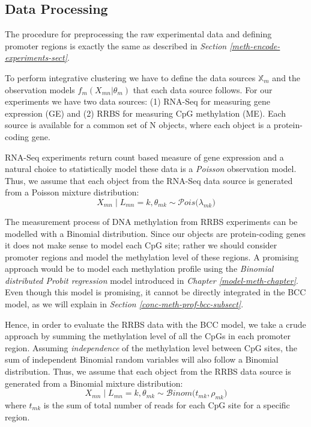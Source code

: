 \subsection{Data Processing}
The procedure for preprocessing the raw experimental data and defining promoter regions is exactly the same as described in \emph{Section \ref{meth-encode-experiments-sect}}. 

To perform integrative clustering we have to define the data sources $\mathbb{X}_{m}$ and the observation models $f_{m}(X_{mn}|\theta_{m})$ that each data source follows. 
For our experiments we have two data sources: (1) RNA-Seq for measuring gene expression (GE) and (2) RRBS for measuring CpG methylation (ME). Each source is available for a common set of N objects, where each object is a protein-coding gene.

RNA-Seq experiments return count based measure of gene expression and a natural choice to statistically model these data is a \emph{Poisson} observation model. Thus, we assume that each object from the RNA-Seq data source is generated from a Poisson mixture distribution:
\begin{equation}
	X_{mn} \mid L_{mn} = k, \theta_{mk} \sim \mathcal{P}ois\big(\lambda_{mk}\big)
\end{equation}

The measurement process of DNA methylation from RRBS experiments can be modelled with a Binomial distribution. Since our objects are protein-coding genes it does not make sense to model each CpG site; rather we should consider promoter regions and model the methylation level of these regions. A promising approach would be to model each methylation profile using the \emph{Binomial distributed Probit regression} model introduced in \emph{Chapter \ref{model-meth-chapter}}. Even though this model is promising, it cannot be directly integrated in the BCC model, as we will explain in \emph{Section \ref{conc-meth-prof-bcc-subsect}}.

Hence, in order to evaluate the RRBS data with the BCC model, we take a crude approach by summing the methylation level of all the CpGs in each promoter region. Assuming \emph{independence} of the methylation level between CpG sites, the sum of independent Binomial random variables will also follow a Binomial distribution. Thus, we assume that each object from the RRBS data source is generated from a Binomial mixture distribution:
\begin{equation}
	X_{mn} \mid L_{mn} = k, \theta_{mk} \sim \mathcal{B}inom\big(t_{mk}, \rho_{mk}\big)
\end{equation}
where $t_{mk}$ is the sum of total number of reads for each CpG site for a specific region.

